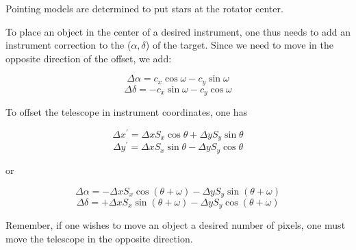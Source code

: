 \documentclass{article}[12pt]
\begin{document}
\begin{latexonly}
Pointing models are determined to put stars at the rotator center.

To place an object in the center of a desired instrument, one thus needs to
add an instrument correction to the ($\alpha,\delta$) of the target. Since
we need to move in the opposite direction of the offset, we add:

$$\Delta\alpha = c_x \cos\omega - c_y \sin\omega$$
$$\Delta\delta = -c_x \sin\omega - c_y \cos\omega$$

To offset the telescope in instrument coordinates, one has

$$\Delta x^\prime = \Delta x S_x \cos\theta + \Delta y S_y \sin\theta$$
$$\Delta y^\prime = \Delta x S_x \sin\theta - \Delta y S_y \cos\theta$$

or

$$\Delta \alpha = - \Delta x S_x \cos(\theta+\omega) 
                  - \Delta y S_y \sin(\theta+\omega)$$
$$\Delta \delta = + \Delta x S_x \sin(\theta+\omega) 
                  - \Delta y S_y \cos(\theta+\omega)$$

Remember, if one wishes to move an object a desired number of pixels, one
must move the telescope in the opposite direction.
\end{latexonly}
\end{document}
